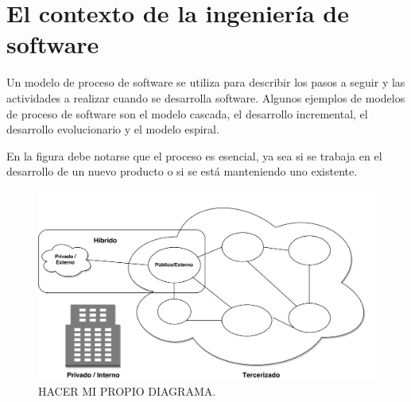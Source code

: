 \section{El contexto de la ingeniería de software}
Un modelo de proceso de software se utiliza para describir los pasos a seguir y las actividades a realizar cuando se desarrolla software. Algunos ejemplos de modelos de proceso de software son el modelo cascada, el desarrollo incremental, el desarrollo evolucionario y el modelo espiral.

En la figura debe notarse que el proceso es esencial, ya sea si se trabaja en el desarrollo de un nuevo producto o si se está manteniendo uno existente.

\begin{figure}[H]
\centering
\includegraphics[width=125mm,scale=1]{Figuras/cloud_computing_types}
\caption{HACER MI PROPIO DIAGRAMA.}
  \label{software_process}
\end{figure}